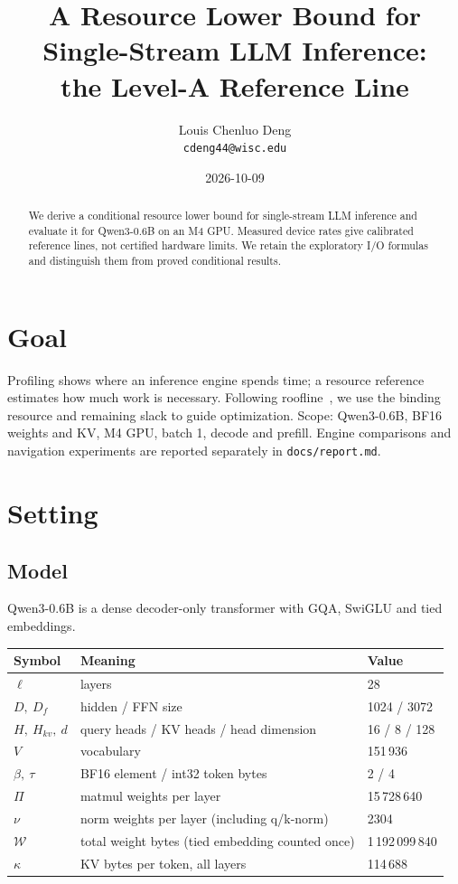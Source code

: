 \documentclass[11pt]{article}
\title{A Resource Lower Bound for Single-Stream LLM Inference:\\
the Level-A Reference Line}
\author{Louis Chenluo Deng\\
\texttt{cdeng44@wisc.edu}}
\date{2026-10-09}
\theoremstyle{definition}
\theoremstyle{remark}
\newcommand{\W}{\mathcal{W}}
\begin{document}
\maketitle

\begin{abstract}
We derive a conditional resource lower bound for single-stream LLM inference and evaluate it for
Qwen3-0.6B on an M4 GPU. Measured device rates give calibrated reference lines, not certified hardware
limits. We retain the exploratory I/O formulas and distinguish them from proved conditional results.
\end{abstract}

\section{Goal}
Profiling shows where an inference engine spends time; a resource reference estimates how much work
is necessary. Following roofline~\cite{roofline}, we use the binding resource and remaining slack to
guide optimization. Scope: Qwen3-0.6B, BF16 weights and KV, M4 GPU, batch 1, decode and prefill.
Engine comparisons and navigation experiments are reported separately in \texttt{docs/report.md}.

\section{Setting}\label{sec:setting}
\subsection{Model}
Qwen3-0.6B is a dense decoder-only transformer with GQA, SwiGLU and tied embeddings.
\begin{center}
\begin{tabular}{lll}
\toprule
Symbol & Meaning & Value \\
\midrule
$\ell$ & layers & 28 \\
$D,\ D_f$ & hidden / FFN size & 1024 / 3072 \\
$H,\ H_{kv},\ d$ & query heads / KV heads / head dimension & 16 / 8 / 128 \\
$V$ & vocabulary & 151\,936 \\
$\beta,\ \tau$ & BF16 element / int32 token bytes & 2 / 4 \\
$\Pi$ & matmul weights per layer & 15\,728\,640 \\
$\nu$ & norm weights per layer (including q/k-norm) & 2304 \\
$\W$ & total weight bytes (tied embedding counted once) & 1\,192\,099\,840 \\
$\kappa$ & KV bytes per token, all layers & 114\,688 \\
\bottomrule
\end{tabular}
\end{center}
\end{document}
